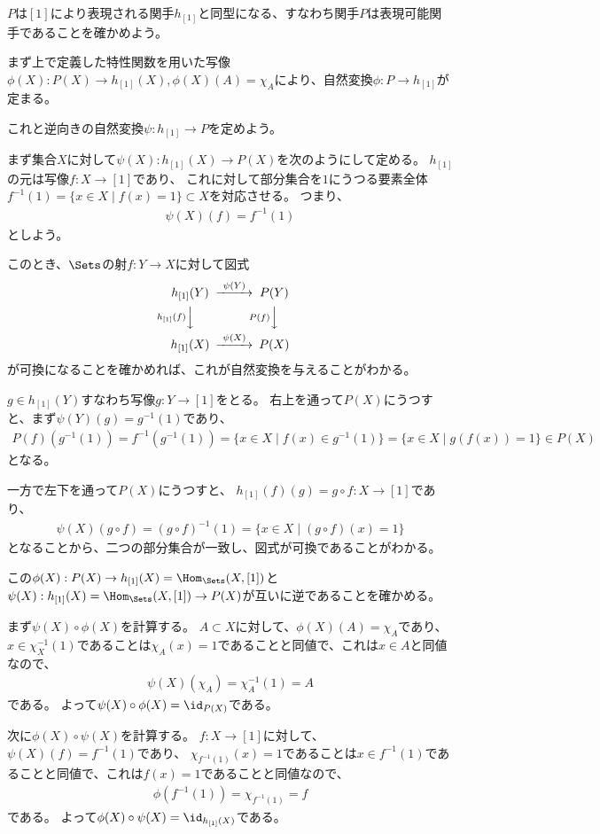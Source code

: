 \documentclass[uplatex]{jsarticle}
\begin{document}
\begin{eg}
$P$は$[1]$により表現される関手$h_{[1]}$と同型になる、すなわち関手$P$は表現可能関手であることを確かめよう。

まず上で定義した特性関数を用いた写像$\phi(X):P(X) \to h_{[1]}(X),  \phi(X)(A) = \chi_A$により、自然変換$\phi:P \to h_{[1]}$が定まる。

これと逆向きの自然変換$\psi:h_{[1]} \to P$を定めよう。

まず集合$X$に対して$\psi(X):h_{[1]}(X) \to P(X)$を次のようにして定める。
$h_{[1]}$の元は写像$f:X \to [1]$であり、
これに対して部分集合を$1$にうつる要素全体$f^{-1}(1)=\{x \in X \mid f(x)=1\} \subset X$を対応させる。
つまり、
\begin{align*}
\psi(X)(f)=f^{-1}(1)
\end{align*}
としよう。

このとき、$\Sets$の射$f:Y \to X$に対して図式
\begin{align*}
\begin{CD}
h_{[1]}(Y)@>\psi(Y)>>P(Y)\\
@Vh_{[1]}(f)VV@VP(f)VV\\
h_{[1]}(X)@>\psi(X)>>P(X)
\end{CD}
\end{align*}
が可換になることを確かめれば、これが自然変換を与えることがわかる。

$g \in h_{[1]}(Y)$すなわち写像$g:Y \to [1]$をとる。
右上を通って$P(X)$にうつすと、まず$\psi(Y)(g)=g^{-1}(1)$であり、
\begin{align*}
P(f)(g^{-1}(1))=f^{-1}(g^{-1}(1))=\{x \in X \mid f(x) \in g^{-1}(1)\}=\{x \in X \mid g(f(x))=1\} \in P(X)
\end{align*}
となる。

一方で左下を通って$P(X)$にうつすと、
$h_{[1]}(f)(g)=g\circ f:X \to [1]$であり、
\begin{align*}
\psi(X)(g\circ f)=(g\circ f)^{-1}(1)=\{x \in X \mid (g\circ f)(x) = 1\}
\end{align*}
となることから、二つの部分集合が一致し、図式が可換であることがわかる。

この$\phi(X):P(X)\to h_{[1]}(X)=\Hom_{\Sets}(X,[1])$と$\psi(X):h_{[1]}(X)=\Hom_{\Sets}(X,[1])\to P(X)$が互いに逆であることを確かめる。

まず$\psi(X)\circ\phi(X)$を計算する。
$A \subset X$に対して、$\phi(X)(A)=\chi_A$であり、
$x\in\chi^{-1}_X(1)$であることは$\chi_A(x)=1$であることと同値で、これは$x\in A$と同値なので、
\begin{align*}
\psi(X)(\chi_A)=\chi_A^{-1}(1)=A
\end{align*}
である。
よって$\psi(X)\circ\phi(X)=\id_{P(X)}$である。

次に$\phi(X)\circ\psi(X)$を計算する。
$f:X\to [1]$に対して、$\psi(X)(f)=f^{-1}(1)$であり、
$\chi_{f^{-1}(1)}(x)=1$であることは$x\in f^{-1}(1)$であることと同値で、これは$f(x)=1$であることと同値なので、
\begin{align*}
\phi(f^{-1}(1))=\chi_{f^{-1}(1)}=f
\end{align*}
である。
よって$\phi(X)\circ\psi(X)=\id_{h_{[1]}(X)}$である。
\end{eg}
\end{document}

